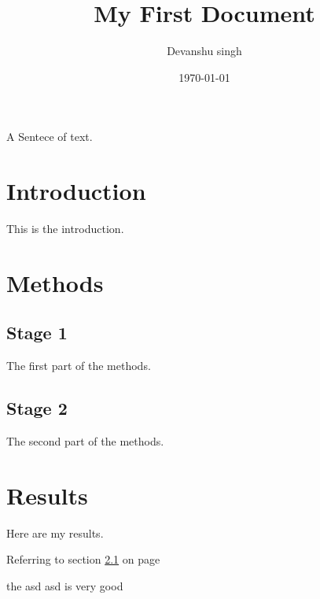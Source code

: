 \documentclass[a4paper,12pt]{article}
\begin{document}
\title{My First Document}
\author{Devanshu singh}
\date{\today}
\maketitle
A Sentece of text.
\section{Introduction}
This is the introduction.

\section{Methods}
\subsection{Stage 1}
\label{sec1}
The first part of the methods.
\subsection{Stage 2}
The second part of the methods.
\section{Results}
Here are my results.
\tableofcontents
\newpage
{}

 Referring to section \ref{sec1} on page \pageref{sec1}


	
	
	the asd asd \cite{latex2e} is very good
	
\end{document}
